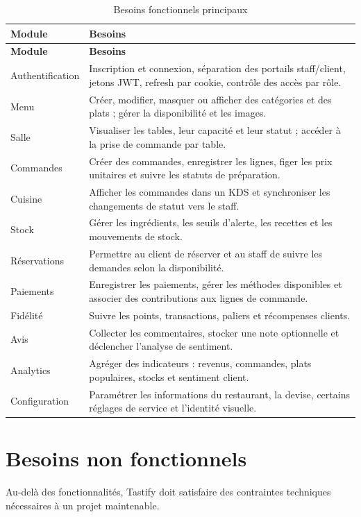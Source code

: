 \begin{longtable}{p{3.2cm}p{10.5cm}}
\caption{Besoins fonctionnels principaux}
\label{tab:besoins-fonctionnels}\\
\toprule
\textbf{Module} & \textbf{Besoins} \\
\midrule
\endfirsthead
\toprule
\textbf{Module} & \textbf{Besoins} \\
\midrule
\endhead
Authentification & Inscription et connexion, séparation des portails staff/client, jetons JWT, refresh par cookie, contrôle des accès par rôle. \\
Menu & Créer, modifier, masquer ou afficher des catégories et des plats ; gérer la disponibilité et les images. \\
Salle & Visualiser les tables, leur capacité et leur statut ; accéder à la prise de commande par table. \\
Commandes & Créer des commandes, enregistrer les lignes, figer les prix unitaires et suivre les statuts de préparation. \\
Cuisine & Afficher les commandes dans un KDS et synchroniser les changements de statut vers le staff. \\
Stock & Gérer les ingrédients, les seuils d'alerte, les recettes et les mouvements de stock. \\
Réservations & Permettre au client de réserver et au staff de suivre les demandes selon la disponibilité. \\
Paiements & Enregistrer les paiements, gérer les méthodes disponibles et associer des contributions aux lignes de commande. \\
Fidélité & Suivre les points, transactions, paliers et récompenses clients. \\
Avis & Collecter les commentaires, stocker une note optionnelle et déclencher l'analyse de sentiment. \\
Analytics & Agréger des indicateurs : revenus, commandes, plats populaires, stocks et sentiment client. \\
Configuration & Paramétrer les informations du restaurant, la devise, certains réglages de service et l'identité visuelle. \\
\bottomrule
\end{longtable}

\section{Besoins non fonctionnels}
Au-delà des fonctionnalités, Tastify doit satisfaire des contraintes techniques nécessaires à un projet maintenable.

